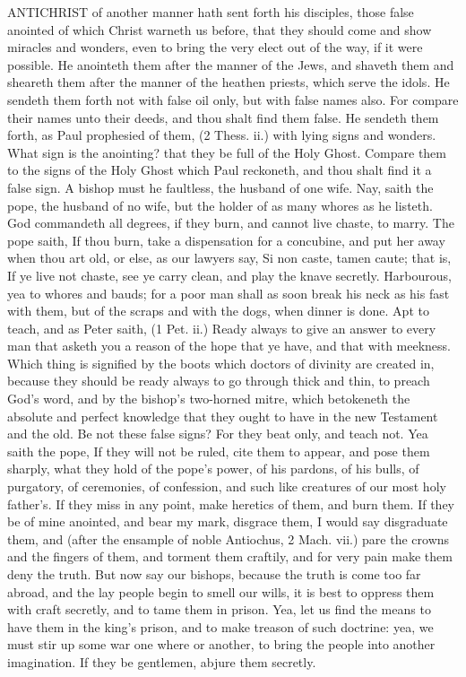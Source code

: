 ANTICHRIST of another manner hath sent forth his 
disciples, those false anointed of which Christ warneth 
us before, that they should come and show miracles and 
wonders, even to bring the very elect out of the way, if it 
were possible. He anointeth them after the manner of 
the Jews, and shaveth them and sheareth them after the 
manner of the heathen priests, which serve the idols. He 
sendeth them forth not with false oil only, but with false 
names also. For compare their names unto their deeds, 
and thou shalt find them false. He sendeth them forth, 
as Paul prophesied of them, (2 Thess. ii.) with lying signs 
and wonders. What sign is the anointing? that they 
be full of the Holy Ghost. Compare them to the signs 
of the Holy Ghost which Paul reckoneth, and thou shalt 
find it a false sign. A bishop must he faultless, the husband
of one wife. Nay, saith the pope, the husband of 
no wife, but the holder of as many whores as he listeth. 
God commandeth all degrees, if they burn, and cannot live 
chaste, to marry. The pope saith, If thou burn, take a 
dispensation for a concubine, and put her away when thou 
art old, or else, as our lawyers say, Si non caste, tamen 
caute; that is, If ye live not chaste, see ye carry clean, and 
play the knave secretly. Harbourous, yea to whores and 
bauds; for a poor man shall as soon break his neck as his 
fast with them, but of the scraps and with the dogs, when 
dinner is done. Apt to teach, and as Peter saith, (1 Pet. ii.) 
Ready always to give an answer to every man that asketh 
you a reason of the hope that ye have, and that with meekness.
Which thing is signified by the boots which doctors 
of divinity are created in, because they should be ready 
always to go through thick and thin, to preach God's word, 
and by the bishop's two-horned mitre, which betokeneth 
the absolute and perfect knowledge that they ought to 
have in the new Testament and the old. Be not these 
false signs? For they beat only, and teach not. Yea 
saith the pope, If they will not be ruled, cite them to 
appear, and pose them sharply, what they hold of the 
pope's power, of his pardons, of his bulls, of purgatory, 
of ceremonies, of confession, and such like creatures of 
our most holy father's. If they miss in any point, make 
heretics of them, and burn them. If they be of mine anointed,
and bear my mark, disgrace them, I would say disgraduate
them, and (after the ensample of noble Antiochus, 
2 Mach. vii.) pare the crowns and the fingers of them, 
and torment them craftily, and for very pain make them 
deny the truth. But now say our bishops, because the 
truth is come too far abroad, and the lay people begin to 
smell our wills, it is best to oppress them with craft secretly,
and to tame them in prison. Yea, let us find the 
means to have them in the king's prison, and to make 
treason of such doctrine: yea, we must stir up some war 
one where or another, to bring the people into another 
imagination. If they be gentlemen, abjure them secretly. 

